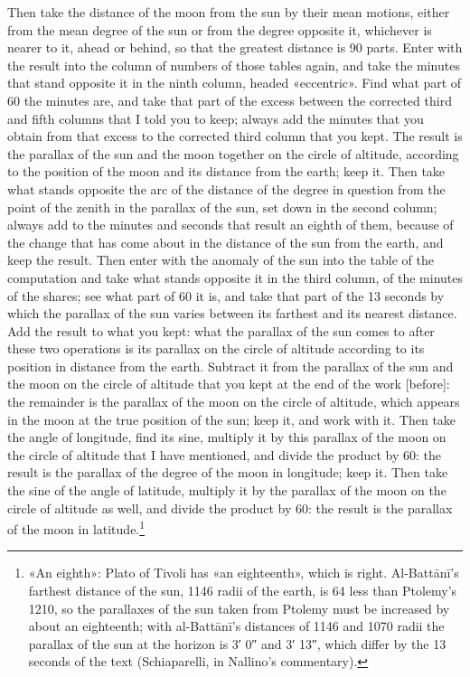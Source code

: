 \documentclass[11pt]{article}
\newcommand{\ArPage}[1]{\marginpar{\footnotesize\color{gray}Ar.\,p.\,#1}}
\begin{document}
\par \ArPage{121}Then take the distance of the moon from the sun by their mean motions, either from the mean degree of the sun or from the degree opposite it, whichever is nearer to it, ahead or behind, so that the greatest distance is 90 parts. Enter with the result into the column of numbers of those tables again, and take the minutes that stand opposite it in the ninth column, headed «eccentric». Find what part of 60 the minutes are, and take that part of the excess between the corrected third and fifth columns that I told you to keep; always add the minutes that you obtain from that excess to the corrected third column that you kept. The result is the parallax of the sun and the moon together on the circle of altitude, according to the position of the moon and its distance from the earth; keep it. Then take what stands opposite the arc of the distance of the degree in question from the point of the zenith in the parallax of the sun, set down in the second column; always add to the minutes and seconds that result an eighth of them, because of the change that has come about in the distance of the sun from the earth, and keep the result. Then enter with the anomaly of the sun into the table of the computation and take what stands opposite it in the third column, of the minutes of the shares; see what part of 60 it is, and take that part of the 13 seconds by which the parallax of the sun varies between its farthest and its nearest distance. Add the result to what you kept: what the parallax of the sun comes to after these two operations is its parallax on the circle of altitude according to its position in distance from the earth. Subtract it from the parallax of the sun and the moon on the circle of altitude that you kept at the end of the work [before]: the remainder is the parallax of the moon on the circle of altitude, which appears in the moon at the true position of the sun; keep it, and work with it. Then take the angle of longitude, find its sine, multiply it by this parallax of the moon on the circle of altitude that I have mentioned, and divide the product by 60: the result is the parallax of the degree of the moon in longitude; keep it. Then take the sine of the angle of latitude, multiply it by the parallax of the moon on the circle of altitude as well, and divide the product by 60: the result is the parallax of the moon in latitude.\footnote{«An eighth»: Plato of Tivoli has «an eighteenth», which is right. Al-Battānī's farthest distance of the sun, 1146 radii of the earth, is 64 less than Ptolemy's 1210, so the parallaxes of the sun taken from Ptolemy must be increased by about an eighteenth; with al-Battānī's distances of 1146 and 1070 radii the parallax of the sun at the horizon is 3′ 0″ and 3′ 13″, which differ by the 13 seconds of the text (Schiaparelli, in Nallino's commentary).}\par
\end{document}
